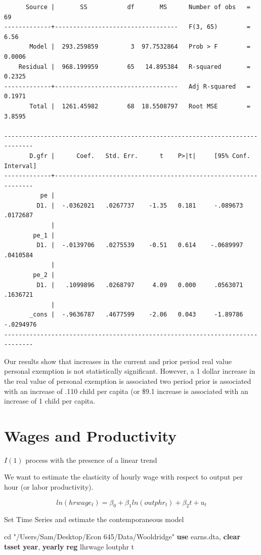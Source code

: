 \documentclass[
]{book}
\newenvironment{Shaded}{\begin{snugshade}}{\end{snugshade}}
\newcommand{\FunctionTok}[1]{\textcolor[rgb]{0.13,0.29,0.53}{\textbf{#1}}}
\newcommand{\KeywordTok}[1]{\textcolor[rgb]{0.13,0.29,0.53}{\textbf{#1}}}
\newcommand{\NormalTok}[1]{#1}
\newcommand{\StringTok}[1]{\textcolor[rgb]{0.31,0.60,0.02}{#1}}
\begin{document}
\begin{verbatim}
      Source |       SS           df       MS      Number of obs   =        69
-------------+----------------------------------   F(3, 65)        =      6.56
       Model |  293.259859         3  97.7532864   Prob > F        =    0.0006
    Residual |  968.199959        65   14.895384   R-squared       =    0.2325
-------------+----------------------------------   Adj R-squared   =    0.1971
       Total |  1261.45982        68  18.5508797   Root MSE        =    3.8595

------------------------------------------------------------------------------
       D.gfr |      Coef.   Std. Err.      t    P>|t|     [95% Conf. Interval]
-------------+----------------------------------------------------------------
          pe |
         D1. |  -.0362021   .0267737    -1.35   0.181     -.089673    .0172687
             |
        pe_1 |
         D1. |  -.0139706   .0275539    -0.51   0.614    -.0689997    .0410584
             |
        pe_2 |
         D1. |   .1099896   .0268797     4.09   0.000     .0563071    .1636721
             |
       _cons |  -.9636787   .4677599    -2.06   0.043     -1.89786   -.0294976
------------------------------------------------------------------------------
\end{verbatim}

Our results show that increases in the current and prior period real value
personal exemption is not statistically significant. However, a 1 dollar increase
in the real value of personal exemption is associated two period prior is associated
with an increase of .110 child per capita (or \$9.1 increase is associated with
an increase of 1 child per capita.

\section{Wages and Productivity}\label{wages-and-productivity}

\(I(1)\) process with the presence of a linear trend

We want to estimate the elasticity of hourly wage with respect to output per hour
(or labor productivity).

\[ ln(hrwage_t)=\beta_0 + \beta_1 ln(outphr_t) + \beta_2 t + u_t \]

Set Time Series and estimate the contemporaneous model

\begin{Shaded}
\begin{Highlighting}[]
\NormalTok{cd }\StringTok{"/Users/Sam/Desktop/Econ 645/Data/Wooldridge"}
\KeywordTok{use}\NormalTok{ earns.dta, }\KeywordTok{clear}
\KeywordTok{tsset} \FunctionTok{year}\NormalTok{, }\FunctionTok{yearly}
\KeywordTok{reg}\NormalTok{ lhrwage loutphr t}
\end{Highlighting}
\end{Shaded}
\end{document}
